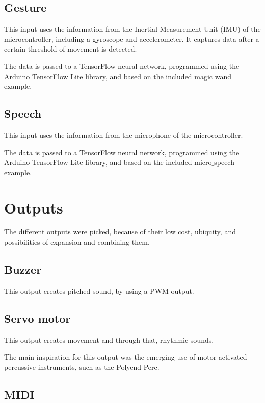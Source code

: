 \subsection{Gesture}

This input uses the information from the Inertial Measurement Unit (IMU) of the microcontroller, including a gyroscope and accelerometer. It captures data after a certain threshold of movement is detected.

The data is passed to a TensorFlow neural network, programmed using the Arduino TensorFlow Lite library, and based on the included magic$\_$wand example.

\subsection{Speech}

This input uses the information from the microphone of the microcontroller.

The data is passed to a TensorFlow neural network, programmed using the Arduino TensorFlow Lite library, and based on the included micro$\_$speech example.

\section{Outputs}

The different outputs were picked, because of their low cost, ubiquity, and possibilities of expansion and combining them.

\subsection{Buzzer}

This output creates pitched sound, by using a PWM output.

\subsection{Servo motor}

This output creates movement and through that, rhythmic sounds.

The main inspiration for this output was the emerging use of motor-activated percussive instruments, such as the Polyend Perc.

\subsection{MIDI}

